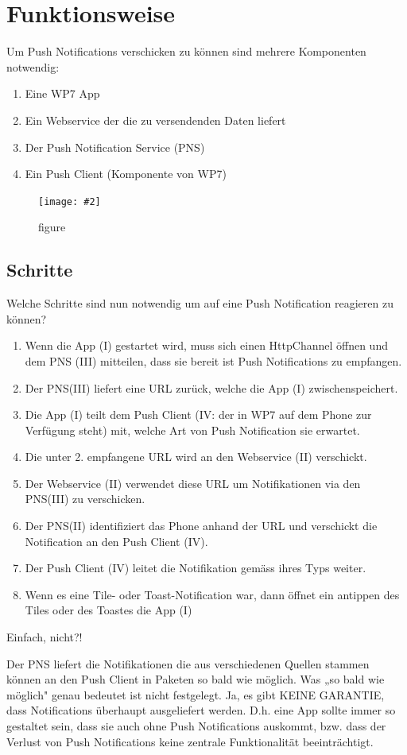 \documentclass[a4paper,10pt]{scrreprt}
\newcommand{\pic}[2][figure]{\begin{figure}[h]
 \centering
 \texttt{[image: \#2]}
 \caption{#1}
\end{figure}
}
\begin{document}
\section{Funktionsweise}
Um Push Notifications verschicken zu können sind mehrere Komponenten notwendig:
\begin{enumerate}
\item Eine WP7 App
\item Ein Webservice der die zu versendenden Daten liefert
\item Der Push Notification Service (PNS)
\item Ein Push Client (Komponente von WP7)
\end{enumerate}

\pic{drawing.png}

\subsection{Schritte}
Welche Schritte sind nun notwendig um auf eine Push Notification reagieren zu können?
\begin{enumerate}


\item Wenn die App (I) gestartet wird, muss sich einen HttpChannel öffnen und dem PNS (III) mitteilen, dass
sie bereit ist Push Notifications zu empfangen.
\item Der PNS(III) liefert eine URL zurück, welche die App (I) zwischenspeichert.
\item Die App (I) teilt dem Push Client (IV: der in WP7 auf dem Phone zur Verfügung steht) mit, welche Art
von Push Notification sie erwartet.
\item Die unter 2. empfangene URL wird an den Webservice (II) verschickt.
\item Der Webservice (II) verwendet diese URL um Notifikationen via den PNS(III) zu verschicken.
\item Der PNS(II) identifiziert das Phone anhand der URL und verschickt die Notification an den Push Client
(IV).
\item Der Push Client (IV) leitet die Notifikation gemäss ihres Typs weiter.
\item Wenn es eine Tile- oder Toast-Notification war, dann öffnet ein antippen des Tiles oder des Toastes die
App (I)
\end{enumerate}
Einfach, nicht?!

Der PNS liefert die Notifikationen die aus verschiedenen Quellen stammen können an den Push Client in
Paketen so bald wie möglich. Was „so bald wie möglich" genau bedeutet ist nicht festgelegt. Ja, es gibt KEINE
GARANTIE, dass Notifications überhaupt ausgeliefert werden. D.h. eine App sollte immer so gestaltet sein, dass
sie auch ohne Push Notifications auskommt, bzw. dass der Verlust von Push Notifications keine zentrale
Funktionalität beeinträchtigt.
\end{document}

